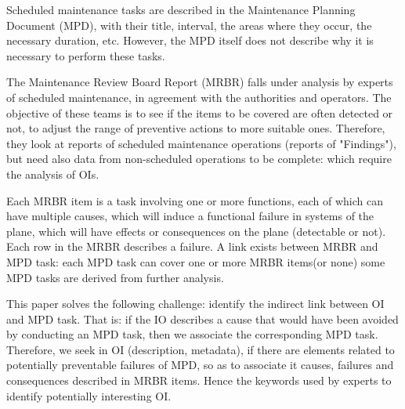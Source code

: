 \documentclass[a4paper,english,submission]{rnti}  %
\begin{document}
Scheduled maintenance tasks are described in the Maintenance Planning Document (MPD), with their title, interval, the areas where they occur, the necessary duration, etc. However, the MPD itself does not describe why it is necessary to perform these tasks.


The Maintenance Review Board Report (MRBR) falls under analysis by experts of scheduled maintenance, in agreement with the authorities and operators. The objective of these teams is to see if the items to be covered are often detected or not, to adjust the range of preventive actions to more suitable ones. Therefore, they look at reports of scheduled maintenance operations (reports of "Findings"), but need also data from non-scheduled operations to be complete: which require the analysis of OIs.

Each MRBR item is a task involving one or more functions, each of which can have multiple causes, which will induce a functional failure in systems of the plane, which will have effects or consequences on the plane (detectable or not). Each row in the MRBR describes a failure. A link exists between MRBR and MPD task: each MPD task can cover one or more MRBR items(or none) some MPD tasks are derived from further analysis. 


This paper solves the following challenge: identify the indirect link between OI and MPD task. That is: if the IO describes a cause that would have been avoided by conducting an MPD task, then we associate the corresponding MPD task. Therefore, we seek in OI (description, metadata), if there are elements related to potentially preventable failures of MPD, so as to associate it causes, failures and consequences described in MRBR items. Hence the keywords used by experts to identify potentially interesting OI.
\end{document}
